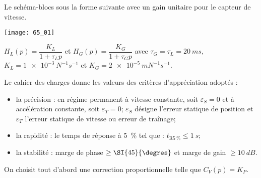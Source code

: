 \normaltrue \difficilefalse \tdifficilefalse
\correctionfalse

\setcounter{question}{0}


\ifcorrection
\else
{}
\fi

\ifprof
\else 

Le schéma-blocs sous la forme suivante avec un gain unitaire pour le capteur
de vitesse.

\begin{marginfigure}
\texttt{[image: 65\_01]}
\end{marginfigure}

$H_L(p)=\dfrac{K_L}{1+\tau_L p}$ et $H_G(p)=\dfrac{K_G}{1+\tau_G p}$  avec $\tau_G=\tau_L = \SI{20}{ms}$, $K_L = \SI{1e-3}{N^{-1}s^{-1}}$ et $K_G = \SI{2e-5}{mN^{-1}s^{-1}}$.


Le cahier des charges donne les valeurs des critères d'appréciation adoptés :
\begin{itemize}
\item la précision : en régime permanent à vitesse constante, soit $\varepsilon_S=0$ et à accélération constante, soit $\varepsilon_T=0$; $\varepsilon_S$ désigne l'erreur statique de position et $\varepsilon_T$ l'erreur statique de vitesse ou erreur de traînage;
\item la rapidité : le temps de réponse à \SI{5}{\%} tel que : $t_{\text{R}\SI{5}{\%}}\leq \SI{1}{s}$;
\item la stabilité : marge de phase $\geq \SI{45}{\degres}$ et marge de gain $\geq \SI{10}{dB}$.
\end{itemize}

On choisit tout d'abord une correction proportionnelle telle que $C_V(p)=K_P$.
\fi

\ifprof
\else 
\fi

\ifprof
\else 
\fi

\ifprof
\else 
\fi

